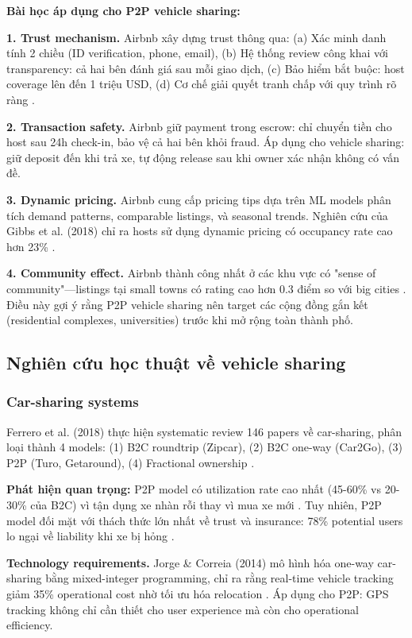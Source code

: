 \textbf{Bài học áp dụng cho P2P vehicle sharing:}

\textbf{1. Trust mechanism.} Airbnb xây dựng trust thông qua: (a) Xác minh danh tính 2 chiều (ID verification, phone, email), (b) Hệ thống review công khai với transparency: cả hai bên đánh giá sau mỗi giao dịch, (c) Bảo hiểm bắt buộc: host coverage lên đến 1 triệu USD, (d) Cơ chế giải quyết tranh chấp với quy trình rõ ràng \cite{ert2016}.

\textbf{2. Transaction safety.} Airbnb giữ payment trong escrow: chỉ chuyển tiền cho host sau 24h check-in, bảo vệ cả hai bên khỏi fraud. Áp dụng cho vehicle sharing: giữ deposit đến khi trả xe, tự động release sau khi owner xác nhận không có vấn đề.

\textbf{3. Dynamic pricing.} Airbnb cung cấp pricing tips dựa trên ML models phân tích demand patterns, comparable listings, và seasonal trends. Nghiên cứu của Gibbs et al. (2018) chỉ ra hosts sử dụng dynamic pricing có occupancy rate cao hơn 23\% \cite{gibbs2018}.

\textbf{4. Community effect.} Airbnb thành công nhất ở các khu vực có "sense of community"—listings tại small towns có rating cao hơn 0.3 điểm so với big cities \cite{guttentag2019}. Điều này gợi ý rằng P2P vehicle sharing nên target các cộng đồng gắn kết (residential complexes, universities) trước khi mở rộng toàn thành phố.

\subsection{Nghiên cứu học thuật về vehicle sharing}

\subsubsection{Car-sharing systems}

Ferrero et al. (2018) thực hiện systematic review 146 papers về car-sharing, phân loại thành 4 models: (1) B2C roundtrip (Zipcar), (2) B2C one-way (Car2Go), (3) P2P (Turo, Getaround), (4) Fractional ownership \cite{ferrero2018}.

\textbf{Phát hiện quan trọng:} P2P model có utilization rate cao nhất (45-60\% vs 20-30\% của B2C) vì tận dụng xe nhàn rỗi thay vì mua xe mới \cite{ferrero2018}. Tuy nhiên, P2P model đối mặt với thách thức lớn nhất về trust và insurance: 78\% potential users lo ngại về liability khi xe bị hỏng \cite{hawlitschek2016}.

\textbf{Technology requirements.} Jorge \& Correia (2014) mô hình hóa one-way car-sharing bằng mixed-integer programming, chỉ ra rằng real-time vehicle tracking giảm 35\% operational cost nhờ tối ưu hóa relocation \cite{jorge2014}. Áp dụng cho P2P: GPS tracking không chỉ cần thiết cho user experience mà còn cho operational efficiency.


